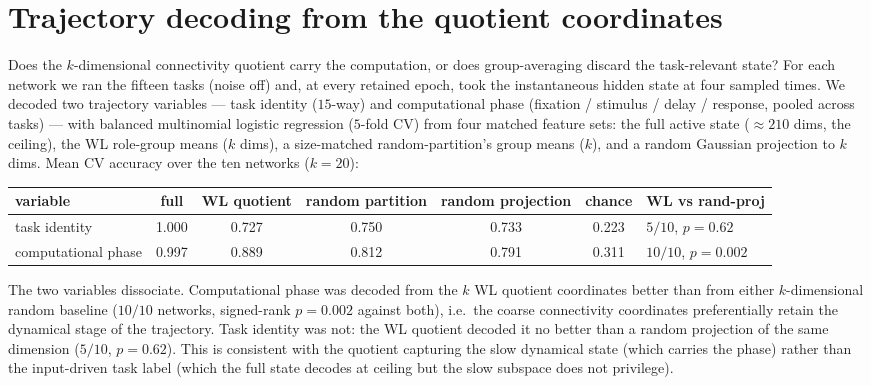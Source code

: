 \documentclass[11pt]{article}
\begin{document}
\section{Trajectory decoding from the quotient coordinates}
\label{sec:decode}
Does the $k$-dimensional connectivity quotient carry the computation, or does group-averaging
discard the task-relevant state? For each network we ran the fifteen tasks (noise off) and, at
every retained epoch, took the instantaneous hidden state at four sampled times. We decoded two
trajectory variables --- task identity ($15$-way) and computational phase (fixation / stimulus /
delay / response, pooled across tasks) --- with balanced multinomial logistic regression
($5$-fold CV) from four matched feature sets: the full active state ($\approx210$ dims, the
ceiling), the WL role-group means ($k$ dims), a size-matched random-partition's group means
($k$), and a random Gaussian projection to $k$ dims. Mean CV accuracy over the ten networks
($k=20$):
\begin{center}\small
\begin{tabular}{lcccccl}
\toprule
variable & full & WL quotient & random partition & random projection & chance & WL vs rand-proj \\
\midrule
task identity     & 1.000 & 0.727 & 0.750 & 0.733 & 0.223 & $5/10$, $p=0.62$ \\
computational phase & 0.997 & 0.889 & 0.812 & 0.791 & 0.311 & $10/10$, $p=0.002$ \\
\bottomrule
\end{tabular}
\end{center}
The two variables dissociate. Computational phase was decoded from the $k$ WL quotient
coordinates better than from either $k$-dimensional random baseline ($10/10$ networks,
signed-rank $p=0.002$ against both), i.e.\ the coarse connectivity coordinates preferentially
retain the dynamical stage of the trajectory. Task identity was not: the WL quotient decoded it no
better than a random projection of the same dimension ($5/10$, $p=0.62$). This is consistent with
the quotient capturing the slow dynamical state (which carries the phase) rather than the
input-driven task label (which the full state decodes at ceiling but the slow subspace does not
privilege).
\end{document}
